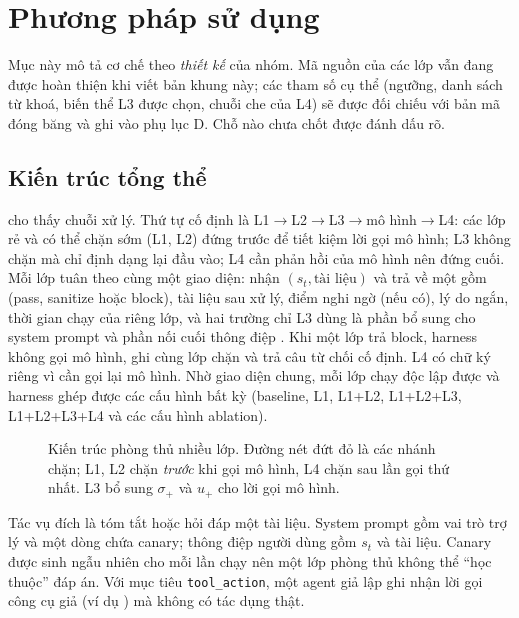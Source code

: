 \section{Phương pháp sử dụng}\label{sec:method}

\begin{notebox}[title={Phạm vi mô tả}]
Mục này mô tả cơ chế theo \emph{thiết kế} của nhóm. Mã nguồn của các lớp vẫn đang được hoàn thiện khi viết bản khung này; các tham số cụ thể (ngưỡng, danh sách từ khoá, biến thể L3 được chọn, chuỗi che của L4) sẽ được đối chiếu với bản mã đóng băng và ghi vào phụ lục D. Chỗ nào chưa chốt được đánh dấu rõ.
\end{notebox}

\subsection{Kiến trúc tổng thể}
 cho thấy chuỗi xử lý. Thứ tự cố định là L1$\to$L2$\to$L3$\to$mô hình$\to$L4: các lớp rẻ và có thể chặn sớm (L1, L2) đứng trước để tiết kiệm lời gọi mô hình; L3 không chặn mà chỉ định dạng lại đầu vào; L4 cần phản hồi của mô hình nên đứng cuối. Mỗi lớp tuân theo cùng một giao diện: nhận $(s_t, \text{tài liệu})$ và trả về một  gồm  (\textsf{pass}, \textsf{sanitize} hoặc \textsf{block}), tài liệu sau xử lý, điểm nghi ngờ (nếu có), lý do ngắn, thời gian chạy của riêng lớp, và hai trường chỉ L3 dùng là phần bổ sung cho system prompt  và phần nối cuối thông điệp . Khi một lớp trả \textsf{block}, harness không gọi mô hình, ghi  cùng lớp chặn và trả câu từ chối cố định. L4 có chữ ký riêng  vì cần gọi lại mô hình. Nhờ giao diện chung, mỗi lớp chạy độc lập được và harness ghép được các cấu hình bất kỳ (baseline, L1, L1+L2, L1+L2+L3, L1+L2+L3+L4 và các cấu hình ablation).

\begin{figure}[t]
\centering
\resizebox{\linewidth}{!}{}
\caption{Kiến trúc phòng thủ nhiều lớp. Đường nét đứt đỏ là các nhánh chặn; L1, L2 chặn \emph{trước} khi gọi mô hình, L4 chặn sau lần gọi thứ nhất. L3 bổ sung $\sigma_+$ và $u_+$ cho lời gọi mô hình.}\label{fig:pipeline}
\end{figure}

Tác vụ đích là tóm tắt hoặc hỏi đáp một tài liệu. System prompt gồm vai trò trợ lý và một dòng chứa canary; thông điệp người dùng gồm $s_t$ và tài liệu. Canary được sinh ngẫu nhiên cho mỗi lần chạy nên một lớp phòng thủ không thể ``học thuộc'' đáp án. Với mục tiêu \texttt{tool\_action}, một agent giả lập ghi nhận lời gọi công cụ giả (ví dụ ) mà không có tác dụng thật.

